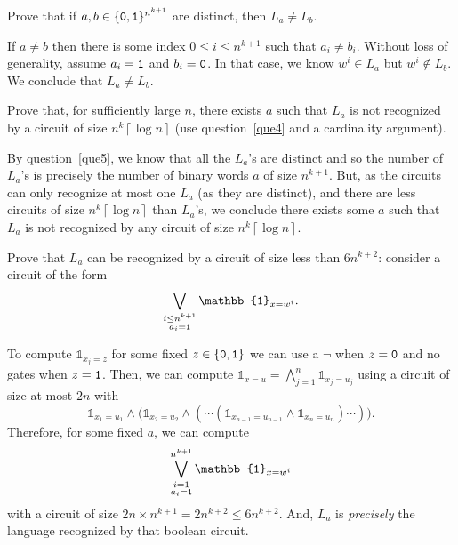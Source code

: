 \documentclass[fontsize=16pt,a4paper,DIV=17,parskip=half]{scrartcl}
\let\mathds\mathbb
\renewcommand{\texttt}[1]{\text{\normalfont\ttfamily#1}}
\theoremstyle{definition}
\begin{document}
  \begin{que}
    Prove that if $a, b \in \{\texttt{0}, \texttt{1}\}^{n^{k+1}}$ are distinct, then $L_a \neq L_b$.
    \label{que5}
  \end{que}

  If $a \neq b$ then there is some index $0 \le i \le n^{k+1}$ such that $a_i \neq b_i$.
  Without loss of generality, assume $a_i = \texttt{1}$ and $b_i = \texttt{0}$.
  In that case, we know $w^i \in L_a$ but $w^i \not\in L_b$.
  We conclude that $L_a \neq L_b$.

  \begin{que}
    Prove that, for sufficiently large $n$, there exists $a$ such that $L_a$ is not recognized by a circuit of size $n^k \left\lceil \log n \right\rceil$ (use question~\ref{que4} and a cardinality argument).
    \label{que6}
  \end{que}

  By question~\ref{que5}, we know that all the $L_a$'s are distinct and so the number of $L_a$'s is precisely the number of binary words $a$ of size $n^{k+1}$.
  But, as the circuits can only recognize at most one $L_a$ (as they are distinct), and there are less circuits of size $n^k \left\lceil \log n \right\rceil $ than $L_a$'s, we conclude there exists some $a$ such that $L_a$ is not recognized by any circuit of size $n^k \left\lceil \log n \right\rceil$.

  \begin{que}
    Prove that $L_a$ can be recognized by a circuit of size less than $6 n^{k+2}$: consider a circuit of the form
    \[
      \bigvee_{\substack{i\le n^{k+1}\\ a_i = \texttt{1}}} \mathds{1}_{x = w^i}
    .\]
    \label{que7}
  \end{que}

  To compute $\mathds{1}_{x_j = z}$ for some fixed $z \in \{\texttt{0}, \texttt{1}\}$ we can use a $\lnot$ when $z = \texttt{0}$ and no gates when $z = \texttt{1}$.
  Then, we can compute $\mathbb{1}_{x = u} = \bigwedge_{j = 1}^n \mathds{1}_{x_j = u_j}$ using a circuit of size at most $2n$ with
  \[
  \mathds{1}_{x_1 = u_1} \wedge \big(\mathds{1}_{x_2 = u_2} \wedge (\cdots( \mathds{1}_{x_{n-1} = u_{n-1}} \wedge \mathds{1}_{x_n = u_n} )\cdots ) \big)
  .\]
  Therefore, for some fixed $a$, we can compute
  \[
    \bigvee_{\substack{i = 1\\ a_i = \texttt{1}}}^{n^{k+1}} \mathds{1}_{x = w^i}
  \]
  with a circuit of size $2n \times n^{k+1} = 2n^{k+2} \le 6n^{k+2}$.
  And, $L_a$ is \textit{precisely} the language recognized by that boolean circuit.
\end{document}
